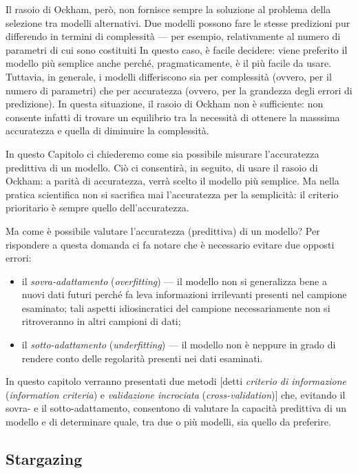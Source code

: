 \documentclass[
  10pt,
  italian,
  a4paper,
  extrafontsizes,onecolumn,openright
  ]{memoir}
\newlength{\rf}
\theoremstyle{definition}
\theoremstyle{definition}
\theoremstyle{definition}
\theoremstyle{definition}
\theoremstyle{remark}
\begin{document}
Il rasoio di Ockham, però, non fornisce sempre la soluzione al problema della selezione tra modelli alternativi. Due modelli possono fare le stesse predizioni pur differendo in termini di complessità --- per esempio, relativamente al numero di parametri di cui sono costituiti In questo caso, è facile decidere: viene preferito il modello più semplice anche perché, pragmaticamente, è il più facile da usare. Tuttavia, in generale, i modelli differiscono sia per complessità (ovvero, per il numero di parametri) che per accuratezza (ovvero, per la grandezza degli errori di predizione). In questa situazione, il rasoio di Ockham non è sufficiente: non consente infatti di trovare un equilibrio tra la necessità di ottenere la masssima accuratezza e quella di diminuire la complessità.

In questo Capitolo ci chiederemo come sia possibile misurare l'accuratezza predittiva di un modello. Ciò ci consentirà, in seguito, di usare il rasoio di Ockham: a parità di accuratezza, verrà scelto il modello più semplice. Ma nella pratica scientifica non si sacrifica mai l'accuratezza per la semplicità: il criterio prioritario è sempre quello dell'accuratezza.

Ma come è possibile valutare l'accuratezza (predittiva) di un modello? Per rispondere a questa domanda \textcite{McElreath_rethinking} ci fa notare che è necessario evitare due opposti errori:

\begin{itemize}
\item
  il \emph{sovra-adattamento} (\emph{overfitting}) --- il modello non si generalizza bene a nuovi dati futuri perché fa leva informazioni irrilevanti presenti nel campione esaminato; tali aspetti idiosincratici del campione necessariamente non si ritroveranno in altri campioni di dati;
\item
  il \emph{sotto-adattamento} (\emph{underfitting}) --- il modello non è neppure in grado di rendere conto delle regolarità presenti nei dati esaminati.
\end{itemize}

In questo capitolo verranno presentati due metodi {[}detti \emph{criterio di informazione} (\emph{information criteria}) e \emph{validazione incrociata} (\emph{cross-validation}){]} che, evitando il sovra- e il sotto-adattamento, consentono di valutare la capacità predittiva di un modello e di determinare quale, tra due o più modelli, sia quello da preferire.

\hypertarget{stargazing}{%
\subsection{Stargazing}\label{stargazing}}
\end{document}
